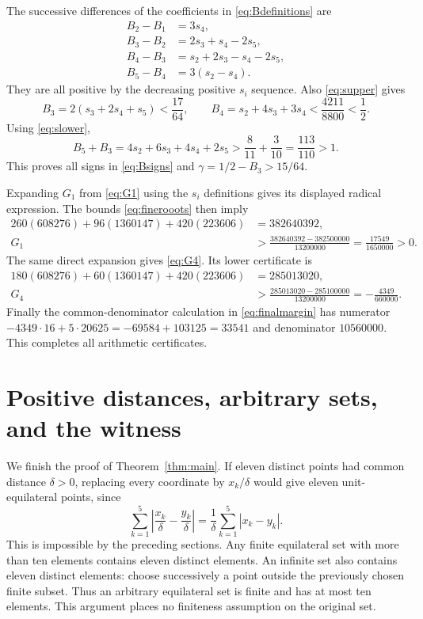 \documentclass[11pt]{article}
\theoremstyle{definition}
\theoremstyle{remark}
\newcommand{\abs}[1]{\left|#1\right|}
\begin{document}
The successive differences of the coefficients in
\eqref{eq:Bdefinitions} are
\[
 \begin{split}
 B_2-B_1&=3s_4,\\
 B_3-B_2&=2s_3+s_4-2s_5,\\
 B_4-B_3&=s_2+2s_3-s_4-2s_5,\\
 B_5-B_4&=3(s_2-s_4).
 \end{split}
\]
They are all positive by the decreasing positive $s_i$ sequence.
Also \eqref{eq:supper} gives
\[
 B_3=2(s_3+2s_4+s_5)<\frac{17}{64},\qquad
 B_4=s_2+4s_3+3s_4<\frac{4211}{8800}<\frac12.
\]
Using \eqref{eq:slower},
\[
 B_5+B_3=4s_2+6s_3+4s_4+2s_5
   >\frac8{11}+\frac3{10}=\frac{113}{110}>1.
\]
This proves all signs in \eqref{eq:Bsigns} and
$\gamma=1/2-B_3>15/64$.

Expanding $G_1$ from \eqref{eq:G1} using the $s_i$ definitions gives
its displayed radical expression. The bounds \eqref{eq:finerooots}
then imply
\[
 \begin{split}
 260(608276)+96(1360147)+420(223606)&=382640392,\\
 G_1&>\frac{382640392-382500000}{13200000}
      =\frac{17549}{1650000}>0.
 \end{split}
\]
The same direct expansion gives \eqref{eq:G4}. Its lower certificate is
\[
 \begin{split}
 180(608276)+60(1360147)+420(223606)&=285013020,\\
 G_4&>\frac{285013020-285100000}{13200000}
      =-\frac{4349}{660000}.
 \end{split}
\]
Finally the common-denominator calculation in
\eqref{eq:finalmargin} has numerator
$-4349\cdot16+5\cdot20625=-69584+103125=33541$ and denominator
$10560000$. This completes all arithmetic certificates.

\section{Positive distances, arbitrary sets, and the witness}\label{sec:lifting}

We finish the proof of Theorem~\ref{thm:main}. If eleven distinct
points had common distance $\delta>0$, replacing every coordinate by
$x_k/\delta$ would give eleven unit-equilateral points, since
\[
 \sum_{k=1}^5\abs{\frac{x_k}{\delta}-\frac{y_k}{\delta}}
   =\frac1\delta\sum_{k=1}^5\abs{x_k-y_k}.
\]
This is impossible by the preceding sections. Any finite equilateral
set with more than ten elements contains eleven distinct elements.
An infinite set also contains eleven distinct elements: choose
successively a point outside the previously chosen finite subset.
Thus an arbitrary equilateral set is finite and has at most ten
elements. This argument places no finiteness assumption on the original
set.
\end{document}

